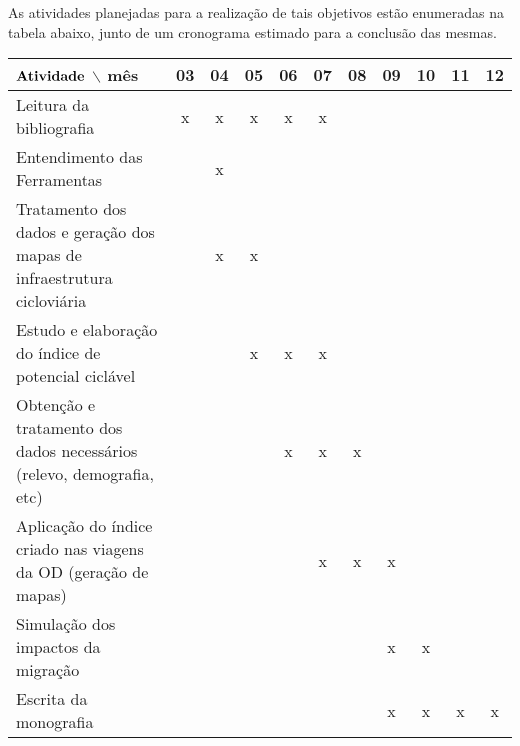\documentclass[a4paper]{article}
\begin{document}
As atividades planejadas para a realização de tais objetivos estão enumeradas na tabela abaixo, junto de um cronograma estimado para a conclusão das mesmas.

\begin{center}
\begin{tabular}{ |m{17em} |c|c|c|c|c|c|c|c|c|c| }
\hline
 \centering $\bf{Atividade}$ $\backslash$ mês& 03 & 04 & 05 & 06 & 07 & 08 & 09 & 10 & 11 & 12 \\ 
 \hline
 Leitura da bibliografia & x & x & x & x & x &  &  &  &  & \\ 
 \hline
 Entendimento das Ferramentas & & x & & & & & & & & \\ 
 \hline
 Tratamento dos dados e geração dos mapas de infraestrutura cicloviária & & x & x & & & & & & & \\ 
 \hline
 Estudo e elaboração do índice de potencial ciclável & & & x & x & x & & & & & \\ 
 \hline
 Obtenção e tratamento dos dados necessários (relevo, demografia, etc) & & & & x & x & x & & & & \\ 
 \hline
 Aplicação do índice criado nas viagens da OD (geração de mapas) & & & & & x & x & x & & & \\ 
 \hline
 Simulação dos impactos da migração & & & & & & & x & x & & \\ 
 \hline
 Escrita da monografia & & & & & & & x & x & x & x \\ 
 \hline
\end{tabular}
\end{center}
\end{document}
